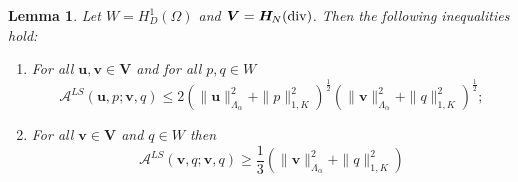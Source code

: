 \documentclass[11pt]{amsart}
\numberwithin{equation}{section}
\newtheorem{lemma}{Lemma}[section]
\theoremstyle{definition}\newtheorem{example}{Example}[section]
\begin{document}
\begin{lemma} \label{lem:stab_var_LS}
Let $W=H^1_D(\Omega)$ and ${{\boldsymbol V}}={{\boldsymbol H}_{\hspace{-0.2mm}N}}({\operatorname{div}})$.
Then the following inequalities hold: 
\begin{enumerate}
\item  For all ${{\mathbf u}}, {{\mathbf v}}\in{{\boldsymbol V}}$ and  for all  $p, q\in W$
\begin{equation}\label{continuity_LS}
{{\mathcal A}}^{LS}({{\mathbf u}},p; {{\mathbf v}},q) 
\le 2( \|{{\mathbf u}}\|^2_{\Lambda_{{\alpha}}} +\|p\|^2_{1,K})^\frac12( \|{{\mathbf v}}\|^2_{\Lambda_{{\alpha}}} +\|q\|^2_{1,K})^\frac12;
\end{equation}  
\item 
For all ${{\mathbf v}}\in{{\boldsymbol V}}$ and $q \in W$ then
\begin{equation}\label{A-coercivity}
{{\mathcal A}}^{LS}({{\mathbf v}},q; {{\mathbf v}},q) 
\ge \frac13 ( \|{{\mathbf v}}\|^2_{\Lambda_{{\alpha}}} +\|q\|^2_{1,K})
\end{equation}
\end{enumerate}

\end{lemma}
\end{document}
